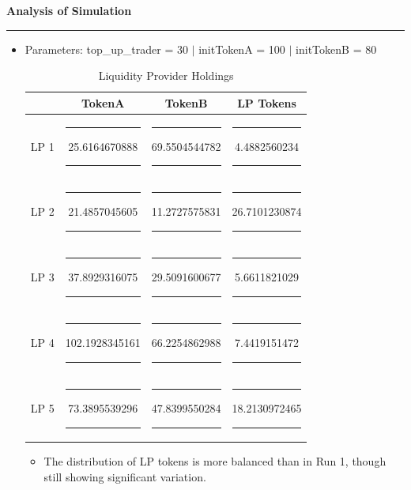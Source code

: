 \documentclass[a4paper]{article}
\newenvironment{solution}[2][]{%
\begin{mdframed}[linecolor=blue!70!black, linewidth=2pt, roundcorner=10pt, backgroundcolor=yellow!10!white, skipabove=12pt, skipbelow=12pt]%
	\textbf{\large #2}
	\par\noindent\rule{\textwidth}{0.4pt}
}{
\end{mdframed}
}
\begin{document}
\begin{solution}{Analysis of Simulation}
\begin{itemize}
\begin{itemize}
		\end{itemize}
		
\item Parameters: top\_up\_trader = 30 $|$ initTokenA = 100 $|$ initTokenB = 80 
\begin{figure}[H]
   \centering
\end{figure}

\begin{table}[H]
	\centering
	\begin{tabular}{|c|c|c|c|}
	\hline
	\textbf{\rule{0pt}{1.2em}Liquidity Provider} & \textbf{TokenA} & \textbf{TokenB} & \textbf{LP Tokens} \\ \hline
	LP 1 & \rule{0.5em}{0pt}25.6164670888\rule{0.5em}{0pt} & \rule{0.5em}{0pt}69.5504544782\rule{0.5em}{0pt} & \rule{0.5em}{0pt}4.4882560234\rule{0.5em}{0pt} \\ \hline
	LP 2 & \rule{0.5em}{0pt}21.4857045605\rule{0.5em}{0pt} & \rule{0.5em}{0pt}11.2727575831\rule{0.5em}{0pt} & \rule{0.5em}{0pt}26.7101230874\rule{0.5em}{0pt} \\ \hline
	LP 3 & \rule{0.5em}{0pt}37.8929316075\rule{0.5em}{0pt} & \rule{0.5em}{0pt}29.5091600677\rule{0.5em}{0pt} & \rule{0.5em}{0pt}5.6611821029\rule{0.5em}{0pt} \\ \hline
	LP 4 & \rule{0.5em}{0pt}102.1928345161\rule{0.5em}{0pt} & \rule{0.5em}{0pt}66.2254862988\rule{0.5em}{0pt} & \rule{0.5em}{0pt}7.4419151472\rule{0.5em}{0pt} \\ \hline
	LP 5 & \rule{0.5em}{0pt}73.3895539296\rule{0.5em}{0pt} & \rule{0.5em}{0pt}47.8399550284\rule{0.5em}{0pt} & \rule{0.5em}{0pt}18.2130972465\rule{0.5em}{0pt} \\ \hline
	\end{tabular}
	\caption{Liquidity Provider Holdings}
\end{table}
\begin{itemize}
	\item The distribution of LP tokens is more balanced than in Run 1, though still showing significant variation.


\end{itemize}
\end{itemize}
\end{solution}
\end{document}
